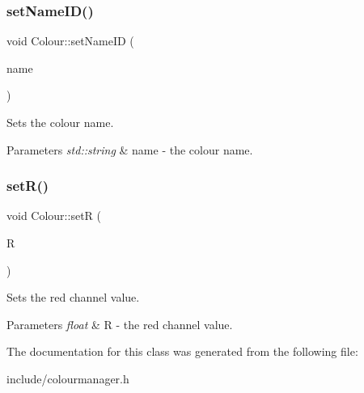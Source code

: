 \subsubsection{\texorpdfstring{set\+Name\+I\+D()}{setNameID()}}
{\footnotesize\ttfamily void Colour\+::set\+Name\+ID (\begin{DoxyParamCaption}\item[{std\+::string}]{name }\end{DoxyParamCaption})\hspace{0.3cm}{\ttfamily [inline]}}



Sets the colour name. 


\begin{DoxyParams}{Parameters}
{\em std\+::string} & name -\/ the colour name. \\
\hline
\end{DoxyParams}
\mbox{\label{classColour_ade98ca5af3cde8f754e9b255dcaaeb24}} 
\subsubsection{\texorpdfstring{set\+R()}{setR()}}
{\footnotesize\ttfamily void Colour\+::setR (\begin{DoxyParamCaption}\item[{float}]{R }\end{DoxyParamCaption})\hspace{0.3cm}{\ttfamily [inline]}}



Sets the red channel value. 


\begin{DoxyParams}{Parameters}
{\em float} & R -\/ the red channel value. \\
\hline
\end{DoxyParams}


The documentation for this class was generated from the following file\+:\begin{DoxyCompactItemize}
\item 
include/colourmanager.\+h\end{DoxyCompactItemize}
